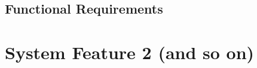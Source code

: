 \subsection{Functional Requirements}
	\begin{comment}
		$<$Itemize the detailed functional requirements associated with this feature.  
		These are the software capabilities that must be present in order for the user 
		to carry out the services provided by the feature, or to execute the use case.  
		Include how the product should respond to anticipated error conditions or 
		invalid inputs. Requirements should be concise, complete, unambiguous, 
		verifiable, and necessary. Use “TBD” as a placeholder to indicate when necessary 
		information is not yet available.$>$
		
		$<$Each requirement should be uniquely identified with a sequence number or a 
		meaningful tag of some kind.$>$
		
		REQ-1:	REQ-2:
	\end{comment}

\section{System Feature 2 (and so on)}

